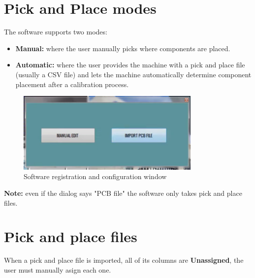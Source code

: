 \documentclass[a4paper,10pt]{report}
\begin{document}
\section{Pick and Place modes}
The software supports two modes:
\begin{itemize}
 \item \textbf{Manual: } where the user manually picks where components are placed.
 \item \textbf{Automatic: } where the user provides the machine with a pick and place file (usually a CSV file) and lets the machine automatically determine component placement after a calibration process.
\end{itemize}
\begin{figure}[!htb]
 \centering
 \includegraphics[width=0.8\textwidth]{scrot3.png}
 \caption{Software registration and configuration window}
\end{figure}
\textbf{Note: } even if the dialog says "PCB file" the software only takes pick and place files.
\newpage
\section{Pick and place files}
When a pick and place file is imported, all of its columns are \textbf{Unassigned}, the user must manually asign each one.\\
\end{document}
